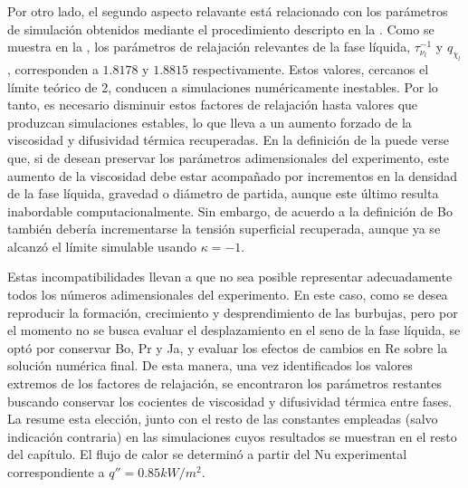 Por otro lado, el segundo aspecto relavante est\'a relacionado con los par\'ametros de simulaci\'on obtenidos mediante el procedimiento descripto en la . Como se muestra en la , los par\'ametros de relajaci\'on relevantes de la fase l\'iquida, $\tau_{\nu_l}^{-1}$ y $q_{\chi_l}$, corresponden a $1.8178$ y $1.8815$ respectivamente. Estos valores, cercanos el l\'imite te\'orico de 2, conducen a simulaciones num\'ericamente inestables. Por lo tanto, es necesario disminuir estos factores de relajaci\'on hasta valores que produzcan simulaciones estables, lo que lleva a un aumento forzado de la viscosidad  y difusividad t\'ermica recuperadas. En la definici\'on de la  puede verse que, si de desean preservar los par\'ametros adimensionales del experimento, este aumento de la viscosidad debe estar acompa\~nado por incrementos en la densidad de la fase l\'iquida, gravedad o di\'ametro de partida, aunque este \'ultimo resulta inabordable computacionalmente. Sin embargo, de acuerdo a la definici\'on de Bo tambi\'en deber\'ia incrementarse la tensi\'on superficial recuperada, aunque ya se alcanz\'o el l\'imite simulable usando $\kappa = -1$.

Estas incompatibilidades llevan a que no sea posible representar adecuadamente todos los n\'umeros adimensionales del experimento. En este caso, como se desea reproducir la formaci\'on, crecimiento y desprendimiento de las burbujas, pero por el momento no se busca evaluar el desplazamiento en el seno de la fase l\'iquida, se opt\'o por conservar Bo, Pr y Ja, y evaluar los efectos de cambios en Re sobre la soluci\'on num\'erica final. De esta manera, una vez identificados los valores extremos de los factores de relajaci\'on, se encontraron los par\'ametros restantes buscando conservar los cocientes de viscosidad y difusividad t\'ermica entre fases. La  resume esta elecci\'on, junto con el resto de las constantes empleadas (salvo indicaci\'on contraria) en las simulaciones cuyos resultados se muestran en el resto del cap\'itulo. El flujo de calor se determin\'o a partir del Nu experimental correspondiente a $q''=0.85kW/m^2$.

